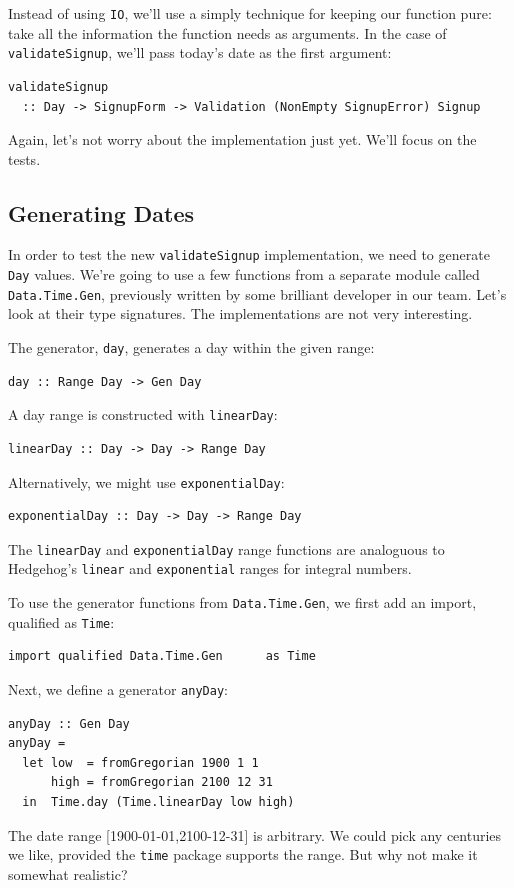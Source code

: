 Instead of using \texttt{IO}, we'll use a simply technique for keeping
our function pure: take all the information the function needs as
arguments. In the case of \texttt{validateSignup}, we'll pass today's
date as the first argument:

\begin{verbatim}
validateSignup
  :: Day -> SignupForm -> Validation (NonEmpty SignupError) Signup
\end{verbatim}
Again, let's not worry about the implementation just yet. We'll focus on
the tests.

\subsection{Generating Dates}
\label{generating-dates}

In order to test the new \texttt{validateSignup} implementation, we need
to generate \texttt{Day} values. We're going to use a few functions from
a separate module called \texttt{Data.Time.Gen}, previously written by
some brilliant developer in our team. Let's look at their type
signatures. The implementations are not very interesting.

The generator, \texttt{day}, generates a day within the given range:

\begin{verbatim}
day :: Range Day -> Gen Day
\end{verbatim}
A day range is constructed with \texttt{linearDay}:

\begin{verbatim}
linearDay :: Day -> Day -> Range Day
\end{verbatim}
Alternatively, we might use \texttt{exponentialDay}:

\begin{verbatim}
exponentialDay :: Day -> Day -> Range Day
\end{verbatim}
The \texttt{linearDay} and \texttt{exponentialDay} range functions are
analoguous to Hedgehog's \texttt{linear} and \texttt{exponential} ranges
for integral numbers.

To use the generator functions from \texttt{Data.Time.Gen}, we first add
an import, qualified as \texttt{Time}:

\begin{verbatim}
import qualified Data.Time.Gen      as Time
\end{verbatim}
Next, we define a generator \texttt{anyDay}:

\begin{verbatim}
anyDay :: Gen Day
anyDay =
  let low  = fromGregorian 1900 1 1
      high = fromGregorian 2100 12 31
  in  Time.day (Time.linearDay low high)
\end{verbatim}
The date range [1900-01-01,2100-12-31]
is arbitrary. We could pick any centuries we like, provided the
\texttt{time} package supports the range. But why not make it somewhat
realistic?

